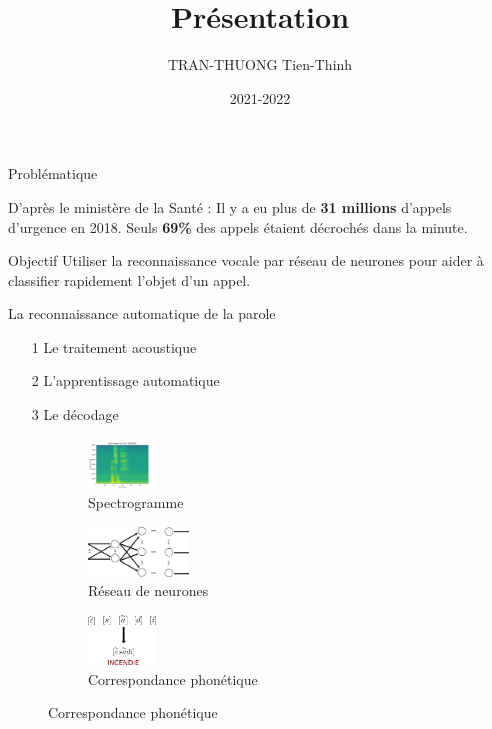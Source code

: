 \documentclass[10pt]{beamer}
\author{TRAN-THUONG Tien-Thinh}
\date{2021-2022}
\title{Présentation}
\begin{document}
\begin{frame}
\titlepage
\end{frame}

\begin{frame}{Problématique}
\begin{alert}{D'après le ministère de la Santé : }
Il y a eu plus de \textbf{31 millions} d'appels d'urgence en 2018. Seuls \textbf{69\%} des appels étaient décrochés dans la minute.
\end{alert}
\begin{block}{Objectif}
Utiliser la reconnaissance vocale par réseau de neurones pour aider à classifier rapidement l'objet d'un appel.
\end{block}
\end{frame}


\begin{frame}{La reconnaissance automatique de la parole}
\begin{itemize}
	\item[1] Le traitement acoustique 
	\item[2] L'apprentissage automatique
	\item[3] Le décodage
\end{itemize}
\begin{figure}
	\begin{subfigure}[]{0.3\textwidth}
		\centering
		\includegraphics[height=50px]{1-Incendie-3.jpg}
  		\caption{Spectrogramme}
	\end{subfigure}
	\begin{subfigure}[]{0.3\textwidth}
		\centering
		\includegraphics[height=50px]{2-Reseau.png}
  		\caption{Réseau de neurones}
	\end{subfigure}
	\begin{subfigure}[]{0.3\textwidth}
		\centering
		\includegraphics[height=50px]{3-Matching.png}
		\caption{Correspondance phonétique}
	\end{subfigure}
\end{figure}
\end{frame}
\end{document}
